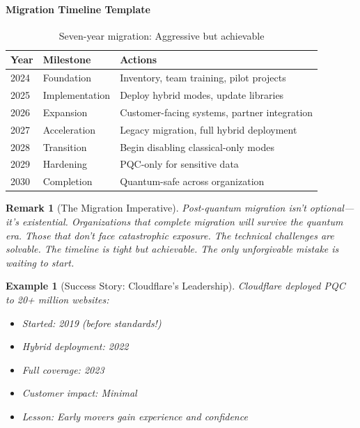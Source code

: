 \documentclass[11pt,a4paper]{article}
\newtheorem{example}{Example}
\newtheorem{remark}{Remark}
\begin{document}
\paragraph{Migration Timeline Template}

\begin{table}[h]
\centering
\begin{tabular}{|l|l|l|}
\hline
\textbf{Year} & \textbf{Milestone} & \textbf{Actions} \\
\hline
2024 & Foundation & Inventory, team training, pilot projects \\
2025 & Implementation & Deploy hybrid modes, update libraries \\
2026 & Expansion & Customer-facing systems, partner integration \\
2027 & Acceleration & Legacy migration, full hybrid deployment \\
2028 & Transition & Begin disabling classical-only modes \\
2029 & Hardening & PQC-only for sensitive data \\
2030 & Completion & Quantum-safe across organization \\
\hline
\end{tabular}
\caption{Seven-year migration: Aggressive but achievable}
\end{table}

\begin{remark}[The Migration Imperative]
Post-quantum migration isn't optional—it's existential. Organizations that complete migration will survive the quantum era. Those that don't face catastrophic exposure. The technical challenges are solvable. The timeline is tight but achievable. The only unforgivable mistake is waiting to start.
\end{remark}

\begin{example}[Success Story: Cloudflare's Leadership]
Cloudflare deployed PQC to 20+ million websites:
\begin{itemize}
    \item Started: 2019 (before standards!)
    \item Hybrid deployment: 2022
    \item Full coverage: 2023
    \item Customer impact: Minimal
    \item Lesson: Early movers gain experience and confidence
\end{itemize}
\end{example}
\end{document}
